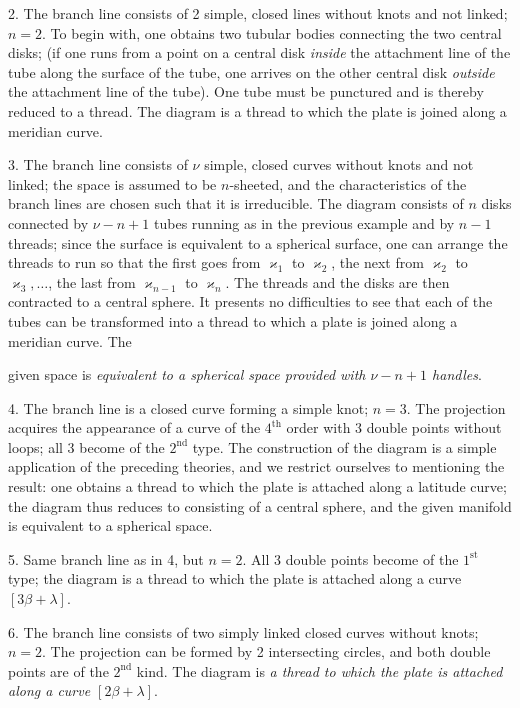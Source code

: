 \documentclass{article}
\begin{document}
2. The branch line consists of 2 simple, closed lines without knots and not linked; $n = 2$. To begin with, one obtains two tubular bodies connecting the two central disks; (if one runs from a point on a central disk \emph{inside} the attachment line of the tube along the surface of the tube, one arrives on the other central disk \emph{outside} the attachment line of the tube). One tube must be punctured and is thereby reduced to a thread. The diagram is a thread to which the plate is joined along a meridian curve.

3. The branch line consists of $\nu$ simple, closed curves without knots and not linked; the space is assumed to be $n$-sheeted, and the characteristics of the branch lines are chosen such that it is irreducible. The diagram consists of $n$ disks connected by $\nu - n + 1$ tubes running as in the previous example and by $n - 1$ threads; since the surface is equivalent to a spherical surface, one can arrange the threads to run so that the first goes from $\varkappa_1$ to $\varkappa_2$, the next from $\varkappa_2$ to $\varkappa_3, \dots$, the last from $\varkappa_{n-1}$ to $\varkappa_n$. The threads and the disks are then contracted to a central sphere. It presents no difficulties to see that each of the tubes can be transformed into a thread to which a plate is joined along a meridian curve. The

given space is \emph{equivalent to a spherical space provided with $\nu - n + 1$ handles}.

4. The branch line is a closed curve forming a simple knot; $n = 3$. The projection acquires the appearance of a curve of the $4^{\text{th}}$ order with 3 double points without loops; all 3 become of the $2^{\text{nd}}$ type. The construction of the diagram is a simple application of the preceding theories, and we restrict ourselves to mentioning the result: one obtains a thread to which the plate is attached along a latitude curve; the diagram thus reduces to consisting of a central sphere, and the given manifold is equivalent to a spherical space.

5. Same branch line as in 4, but $n = 2$. All 3 double points become of the $1^{\text{st}}$ type; the diagram is a thread to which the plate is attached along a curve $[3\beta + \lambda]$.

6. The branch line consists of two simply linked closed curves without knots; $n = 2$. The projection can be formed by 2 intersecting circles, and both double points are of the $2^{\text{nd}}$ kind. The diagram is \emph{a thread to which the plate is attached along a curve $[2\beta + \lambda]$}.
\end{document}
